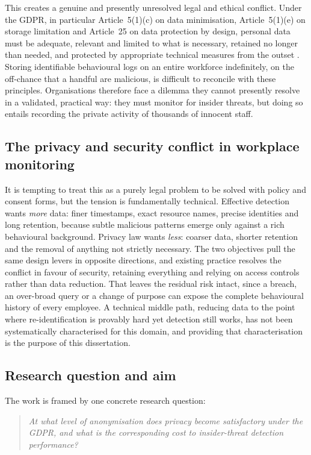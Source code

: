 \documentclass[10pt,a4paper]{article}
\begin{document}
This creates a genuine and presently unresolved legal and ethical conflict. Under the GDPR, in particular Article~5(1)(c) on data minimisation, Article~5(1)(e) on storage limitation and Article~25 on data protection by design, personal data must be adequate, relevant and limited to what is necessary, retained no longer than needed, and protected by appropriate technical measures from the outset \cite{voigt2017}. Storing identifiable behavioural logs on an entire workforce indefinitely, on the off-chance that a handful are malicious, is difficult to reconcile with these principles. Organisations therefore face a dilemma they cannot presently resolve in a validated, practical way: they must monitor for insider threats, but doing so entails recording the private activity of thousands of innocent staff.

\subsection{The privacy and security conflict in workplace monitoring}
It is tempting to treat this as a purely legal problem to be solved with policy and consent forms, but the tension is fundamentally technical. Effective detection wants \emph{more} data: finer timestamps, exact resource names, precise identities and long retention, because subtle malicious patterns emerge only against a rich behavioural background. Privacy law wants \emph{less}: coarser data, shorter retention and the removal of anything not strictly necessary. The two objectives pull the same design levers in opposite directions, and existing practice resolves the conflict in favour of security, retaining everything and relying on access controls rather than data reduction. That leaves the residual risk intact, since a breach, an over-broad query or a change of purpose can expose the complete behavioural history of every employee. A technical middle path, reducing data to the point where re-identification is provably hard yet detection still works, has not been systematically characterised for this domain, and providing that characterisation is the purpose of this dissertation.

\subsection{Research question and aim}
The work is framed by one concrete research question:

\begin{quote}\itshape
At what level of anonymisation does privacy become satisfactory under the GDPR, and what is the corresponding cost to insider-threat detection performance?
\end{quote}
\end{document}
